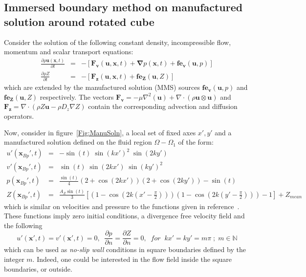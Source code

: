 \documentclass[12pt]{article}
\begin{document}
\subsection{Immersed boundary method on manufactured solution around rotated cube}

Consider the solution of the following constant density, incompressible flow, momentum and scalar transport equations:
%
\begin{eqnarray}
  \frac{\partial \rho \mathbf{u}(\mathbf{x},t)}{\partial t} &=& -\left[ \mathbf{F_v}(\mathbf{u},\mathbf{x},t) + \boldsymbol{\nabla} p(\mathbf{x},t) + \mathbf{fe_v}(\mathbf{u},p) \right] \label{eq:mmsMom} \\
  \frac{\partial \rho Z}{\partial t} &=& -\left[   \mathbf{F_z}(\mathbf{u},\mathbf{x},t) +  \mathbf{fe_Z}(\mathbf{u},Z)   \right]
  \label{eq:mmsZ}
\end{eqnarray}
%
which are extended by the manufactured solution (MMS) sources $\mathbf{fe_v}(\mathbf{u},p)$ and $\mathbf{fe_Z}(\mathbf{u},Z)$ respectively. The vectors $\mathbf{F_v}=-\mu \nabla^2(\mathbf{u}) + \nabla \cdot \left( \rho \mathbf{u} \otimes \mathbf{u} \right)$ and $\mathbf{F_z}= \nabla \cdot \left( \rho Z \mathbf{u} - \rho D_z \nabla Z \right) $ contain the corresponding advection and diffusion operators.

Now, consider in figure~\ref{Fig:ManuSoln}, a local set of fixed axes $x',y'$ and a manufactured solution defined on the fluid region $\Omega - \Omega_1$ of the form:
%
\begin{eqnarray}
   u'(\mathbf{x}_{Bp}',t) &=& -\sin(t) \; \sin(kx')^2 \; \sin(2ky') \label{eq:upmf} \\
   v'(\mathbf{x}_{Bp}',t) &=&   \sin(t) \; \sin(2kx') \; \sin(ky')^2 \label{eq:vpmf} \\
   p(\mathbf{x}_{Bp}',t) &=& \frac{\sin(t)}{4} \left( 2+\cos(2kx') \right) \left( 2+\cos(2ky') \right) - \sin(t) \label{eq:pmf} \\
   Z(\mathbf{x}_{Bp}',t) &=& \frac{A_Z \sin(t)}{3} \left[ \left( 1-\cos(2k(x'-\frac{\pi}{2})) \right)
                                                                                   \left( 1-\cos(2k(y'-\frac{\pi}{2})) \right) - 1 \right] + Z_{mean} \label{eq:qmf}
\end{eqnarray}
%
which is similar on velocities and pressure to the functions given in reference~\cite{Weinan:1}.  These functions imply zero initial conditions, a divergence free velocity field and the following
%
\begin{equation}
   u'(\mathbf{x}',t)=v'(\mathbf{x}',t)=0, \; \; \frac{\partial p}{\partial n} = \frac{\partial Z}{\partial n}=0, \; \;
   for \; \; kx'=ky'= m \pi \; ; \; m \in \mathbb{N}
\end{equation}
%
which can be used as \textit{no-slip wall} conditions in square boundaries defined by the integer $m$. Indeed, one could be interested in the flow field inside the square boundaries, or outside.
\end{document}

